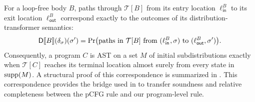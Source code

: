For a loop-free body $B$, paths through $\mathcal{T}[B]$ from its
entry location $\ell_{\mathsf{in}}^B$ to its exit location
$\ell_{\mathsf{out}}^B$ correspond exactly to the outcomes of its
distribution-transformer semantics:
\[
 \mathsf{D}\llbracket B\rrbracket(\delta_{\sigma})(\sigma')
 =
 \Pr\bigl(
   \text{paths in }\mathcal{T}[B]
   \text{ from }(\ell_{\mathsf{in}}^B,\sigma)
   \text{ to }(\ell_{\mathsf{out}}^B,\sigma')
 \bigr).
\]
Consequently, a program $C$ is AST on a set $M$ of initial
subdistributions exactly when $\mathcal{T}[C]$ reaches its terminal
location almost surely from every state in $\textnormal{supp}(M)$. A structural
proof of this correspondence is summarized in
. This correspondence provides the bridge used
in  to transfer soundness and relative
completeness between the pCFG rule and our program-level rule.
